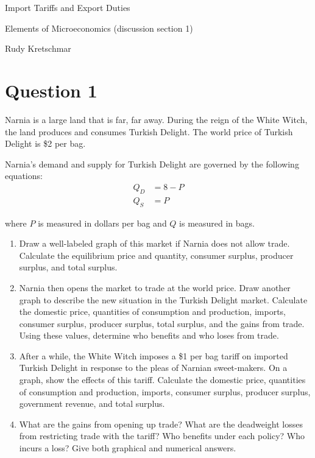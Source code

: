 \documentclass[12pt]{article}
\begin{document}
\begin{center}
\Large Import Tariffs and Export Duties

\medskip

\normalsize Elements of Microeconomics (discussion section 1)

\medskip

\small Rudy Kretschmar
\end{center}
\section*{Question 1}
Narnia is a large land that is far, far away. During the reign of the White Witch, 
the land produces and consumes Turkish Delight. The world price of Turkish Delight 
is \$2 per bag.

Narnia's demand and supply for Turkish Delight are governed by the following equations:
\begin{align*}
    Q_D &= 8 - P \\
    Q_S &= P
\end{align*}

where \(P\) is measured in dollars per bag and \(Q\) is measured in bags.

\begin{enumerate}[label=(\alph*)]

\item Draw a well-labeled graph of this market if Narnia does not allow trade. 
Calculate the equilibrium price and quantity, consumer surplus, producer surplus, 
and total surplus.

\item Narnia then opens the market to trade at the world price. Draw another graph 
to describe the new situation in the Turkish Delight market. Calculate the domestic 
price, quantities of consumption and production, imports, consumer surplus, 
producer surplus, total surplus, and the gains from trade. Using these values, 
determine who benefits and who loses from trade.

\item After a while, the White Witch imposes a \$1 per bag tariff on imported 
Turkish Delight in response to the pleas of Narnian sweet-makers. On a graph, 
show the effects of this tariff. Calculate the domestic price, quantities of 
consumption and production, imports, consumer surplus, producer surplus, 
government revenue, and total surplus.

\item What are the gains from opening up trade? What are the deadweight losses 
from restricting trade with the tariff? Who benefits under each policy? Who incurs a loss? Give both graphical and numerical answers.

\end{enumerate}
\end{document}
